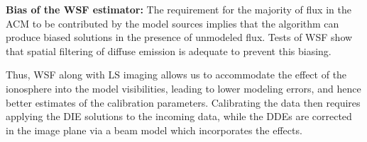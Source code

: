 \documentclass{aa}
\begin{document}
\begin{table}[tbh]
\caption{Flux ratios of bright sources within snapshot from Obs. 3.}
\label{tab:Flux-ratios-of-1}
\end{table}


\textbf{Bias of the WSF estimator:} The  requirement for the majority of flux in
the ACM  to be contributed by the  model sources implies that  the algorithm can
produce biased solutions  in the presence of unmodeled flux.   Tests of WSF show
that spatial filtering of diffuse emission is adequate to prevent this biasing.

Thus,  WSF along with  LS imaging  allows us  to accommodate  the effect  of the
ionosphere into  the model visibilities,  leading to lower modeling  errors, and
hence better estimates of the calibration parameters.  Calibrating the data then
requires applying  the DIE solutions  to the incoming  data, while the  DDEs are
corrected in the image plane via a beam model which incorporates the effects.
\end{document}
